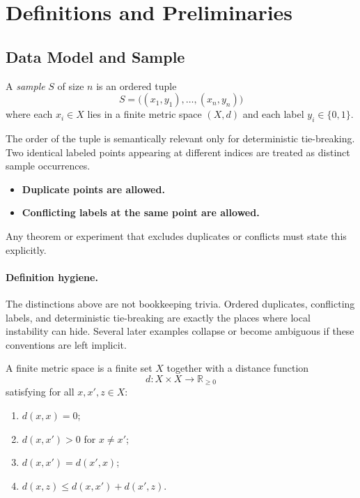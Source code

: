 \section{Definitions and Preliminaries}
\label{sec:definitions}

\subsection{Data Model and Sample}

\begin{definition}[Sample]
A \emph{sample} $S$ of size $n$ is an ordered tuple
\[
S = \big((x_1, y_1), \ldots, (x_n, y_n)\big)
\]
where each $x_i \in X$ lies in a finite metric space $(X, d)$ and each label $y_i \in \{0, 1\}$.
\end{definition}

The order of the tuple is semantically relevant only for deterministic tie-breaking. Two identical labeled points appearing at different indices are treated as distinct sample occurrences.

\begin{itemize}
    \item \textbf{Duplicate points are allowed.}
    \item \textbf{Conflicting labels at the same point are allowed.}
\end{itemize}

Any theorem or experiment that excludes duplicates or conflicts must state this explicitly.

\paragraph{Definition hygiene.}
The distinctions above are not bookkeeping trivia. Ordered duplicates,
conflicting labels, and deterministic tie-breaking are exactly the places where
local instability can hide. Several later examples collapse or become
ambiguous if these conventions are left implicit.

\begin{definition}
A finite metric space is a finite set $X$ together with a distance function
\[
d : X \times X \to \mathbb{R}_{\ge 0}
\]
satisfying for all $x, x', z \in X$:
\begin{enumerate}
    \item $d(x, x) = 0$;
    \item $d(x, x') > 0$ for $x \ne x'$;
    \item $d(x, x') = d(x', x)$;
    \item $d(x, z) \le d(x, x') + d(x', z)$.
\end{enumerate}
\end{definition}

